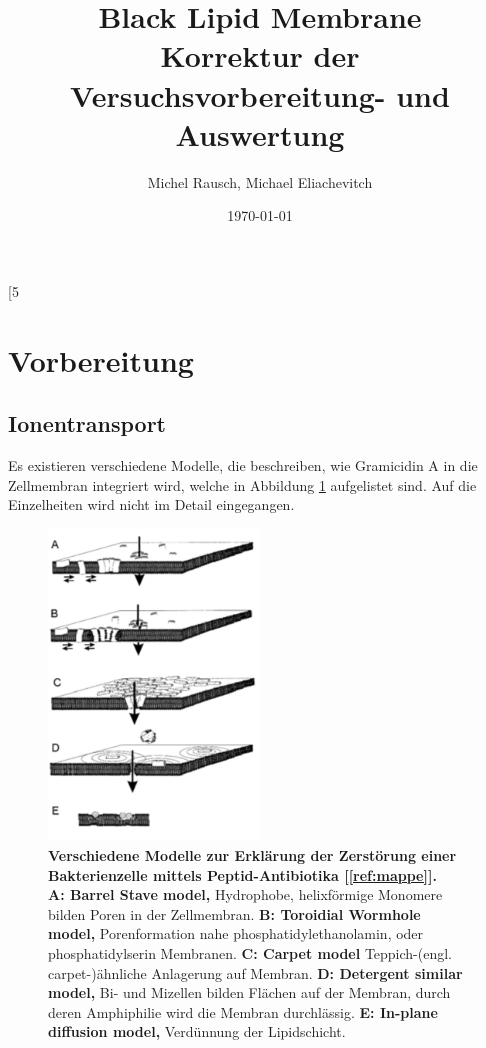 [5~\documentclass[a4paper,ngerman]{scrartcl}
\title{Black Lipid Membrane\\Korrektur der Versuchsvorbereitung- und Auswertung}
\date{\today}
\author{Michel Rausch, Michael Eliachevitch}
\begin{document}
\maketitle
\tableofcontents
\newpage

\section{Vorbereitung}

\subsection{Ionentransport}

Es existieren verschiedene Modelle, die beschreiben, wie Gramicidin A in die Zellmembran integriert wird, welche in Abbildung \ref{fig:wirkmechanismus} aufgelistet sind. Auf die Einzelheiten wird nicht im Detail eingegangen.



\begin{figure}
\includegraphics[width=0.5\textwidth]{abbildungen/wirkmechanismus.png}
\caption{\textbf{Verschiedene Modelle zur Erklärung der Zerstörung einer Bakterienzelle mittels Peptid-Antibiotika [\ref{ref:mappe}].}\\
\textbf{A: Barrel Stave model,} 
Hydrophobe, helixförmige Monomere bilden Poren in der Zellmembran.
\textbf{B: Toroidial Wormhole model,}  
Porenformation nahe phosphatidylethanolamin, oder phosphatidylserin Membranen. 
\textbf{C: Carpet model}  
Teppich-(engl. carpet-)ähnliche Anlagerung auf Membran.
\textbf{D:  Detergent similar model,}
Bi- und Mizellen bilden Flächen auf der Membran, durch deren Amphiphilie wird die Membran durchlässig.
\textbf{E:  In-plane diffusion model,}
Verdünnung der Lipidschicht.
}
\label{fig:wirkmechanismus}
\end{figure}
\end{document}

